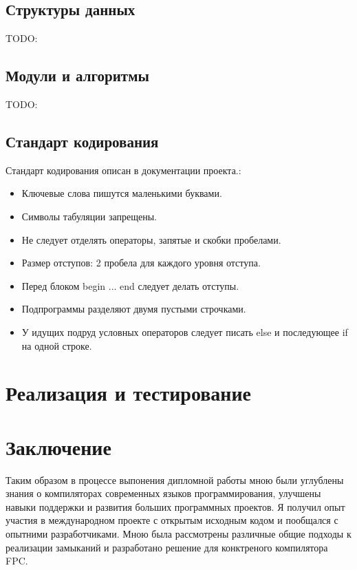 \documentclass{imcs}
\begin{document}
\subsection{Структуры данных}

TODO:

\subsection{Модули и алгоритмы}

TODO:

\subsection{Стандарт кодирования}

Стандарт кодирования описан в документации проекта.\cite{codingstyle}:
\begin{itemize}
  \item Ключевые слова пишутся маленькими буквами.
  \item Символы табуляции запрещены.
  \item Не следует отделять операторы, запятые и скобки пробелами.
  \item Размер отступов: 2 пробела для каждого уровня отступа.
  \item Перед блоком begin ... end следует делать отступы.
  \item Подпрограммы разделяют двумя пустыми строчками.
  \item У идущих подруд условных операторов следует писать else и последующее if 
на одной строке.
\end{itemize}

\section{Реализация и тестирование}

\pagebreak

\section*{Заключение}

Таким образом в процессе выпонения дипломной работы мною были углублены
знания о компиляторах современных языков программирования, улучшены навыки
поддержки и развития больших программных проектов. Я получил опыт участия в 
международном проекте с открытым исходным кодом и пообщался с опытними разработчиками.
Мною была рассмотрены различные общие подходы к реализации замыканий и разработано
решение для конктреного компилятора FPC.
\end{document}

